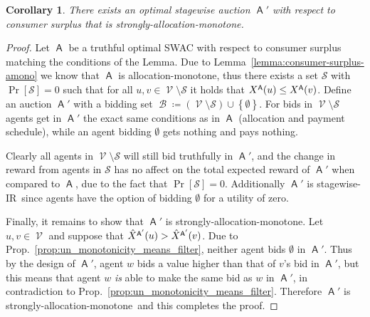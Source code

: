 \documentclass[11pt,letterpaper]{article}
\newcommand{\set}[1]{\left\{#1\right\}}
\newcommand{\brackets}[1]{\left( #1 \right)}
\newcommand{\swir}{stagewise-IR\xspace}
\newcommand{\samono}{strongly-allocation-monotone\xspace}
\newcommand{\amono}{allocation-monotone\xspace}
\newcommand{\swac}{SWAC\xspace}
\DeclareMathOperator{\A}{\auc{A}}
\DeclareMathOperator{\B}{\mathcal{B}}
\renewcommand{\S}{\mathcal{S}}
\DeclareMathOperator{\V}{\mathcal{V}}
\theoremstyle{plain}
\newtheorem{corollary}[theorem]{Corollary}
\newcommand{\auc}[1]{\mathsf{#1}}
\begin{document}
\begin{corollary}\label{corollary:consumer-surplus-samono-wlog}
    There exists an optimal stagewise auction \(\A'\) with respect to consumer surplus that is \emph{\samono}.
\end{corollary}
\begin{proof}
    Let $\A$ be a truthful optimal \swac with respect to consumer surplus matching the conditions of the Lemma. Due to Lemma~\ref{lemma:consumer-surplus-amono} we know that $\A$ is \amono, thus there exists a set $\S$ with $\Pr[\S]=0$ such that for all $u,v\in\V\setminus\S$ it holds that $\x[\A]{u}\leq\x[\A]{v}$. Define an auction $\A'$ with a bidding set $\B\coloneq\brackets{\V\setminus\S}\cup\set{\emptyset}$. For bids in $\V\setminus\S$ agents get in $\A'$ the exact same conditions as in $\A$ (allocation and payment schedule), while an agent bidding $\emptyset$ gets nothing and pays nothing.

    Clearly all agents in $\V\setminus\S$ will still bid truthfully in $\A'$, and the change in reward from agents in $\S$ has no affect on the total expected reward of $\A'$ when compared to $\A$, due to the fact that $\Pr[\S]=0$. Additionally $\A'$ is \swir\ since agents have the option of bidding $\emptyset$ for a utility of zero.

    Finally, it remains to show that $\A'$ is \samono. Let $u,v\in\V$ and suppose that $\xhat[\A']{u}>\xhat[\A']{v}$. Due to Prop.~\ref{prop:un_monotonicity_means_filter}, neither agent bids $\emptyset$ in $\A'$. Thus by the design of $\A'$, agent $w$ bids a value higher than that of $v$'s bid in $\A'$, but this means that agent $w$ \emph{is} able to make the same bid as $w$ in $\A'$, in contradiction to Prop.~\ref{prop:un_monotonicity_means_filter}. Therefore $\A'$ is \samono\ and this completes the proof.
\end{proof}
\end{document}
